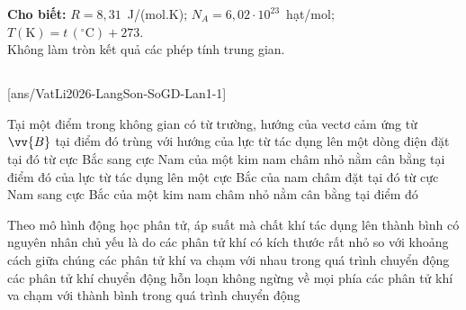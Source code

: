 \def\CheDo{solcolor}%
\def\tenchuong{Sở GD\&ĐT Lạng Sơn -- Lần 1}
\def\thuonghieu{VẬT LÍ 12 -- Eduzy.com.vn}
\def\TachCauDS{1}
\def\TachCauLG{1}




	\noindent\textbf{Cho biết:} $R=8{,}31$~J/(mol.K); $N_A=6{,}02\cdot 10^{23}$~hạt/mol; $T(\text{K})=t\,(^\circ\text{C})+273$.\\
	Không làm tròn kết quả các phép tính trung gian.

	\noindent
	\subsection*{}
	\setcounter{ex}{0}
	[ans/VatLi2026-LangSon-SoGD-Lan1-1]

	\begin{ex}%
		Tại một điểm trong không gian có từ trường, hướng của vectơ cảm ứng từ $\vv{B}$ tại điểm đó trùng với hướng
		\choice
		{của lực từ tác dụng lên một dòng điện đặt tại đó}
		{từ cực Bắc sang cực Nam của một kim nam châm nhỏ nằm cân bằng tại điểm đó}
		{của lực từ tác dụng lên một cực Bắc của nam châm đặt tại đó}
		{\True từ cực Nam sang cực Bắc của một kim nam châm nhỏ nằm cân bằng tại điểm đó}
	\end{ex}

	\begin{ex}%
		Theo mô hình động học phân tử, áp suất mà chất khí tác dụng lên thành bình có nguyên nhân chủ yếu là do
		\choice
		{các phân tử khí có kích thước rất nhỏ so với khoảng cách giữa chúng}
		{các phân tử khí va chạm với nhau trong quá trình chuyển động}
		{các phân tử khí chuyển động hỗn loạn không ngừng về mọi phía}
		{\True các phân tử khí va chạm với thành bình trong quá trình chuyển động}
	\end{ex}

